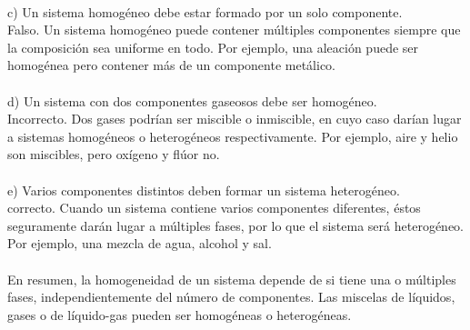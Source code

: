 \documentclass{article}
\begin{document}
\begin{itemize}
\\
c) Un sistema homogéneo debe estar formado por un solo componente.\\
Falso. Un sistema homogéneo puede contener múltiples componentes siempre que la composición sea uniforme en todo. Por ejemplo, una aleación puede ser homogénea pero contener más de un componente metálico.\\
\\
d) Un sistema con dos componentes gaseosos debe ser homogéneo.\\
Incorrecto. Dos gases podrían ser miscible o inmiscible, en cuyo caso darían lugar a sistemas homogéneos o heterogéneos respectivamente. Por ejemplo, aire y helio son miscibles, pero oxígeno y flúor no.\\
\\
e) Varios componentes distintos deben formar un sistema heterogéneo.\\
correcto. Cuando un sistema contiene varios componentes diferentes, éstos seguramente darán lugar a múltiples fases, por lo que el sistema será heterogéneo. Por ejemplo, una mezcla de agua, alcohol y sal.\\
\\
En resumen, la homogeneidad de un sistema depende de si tiene una o múltiples fases, independientemente del número de componentes. Las miscelas de líquidos, gases o de líquido-gas pueden ser homogéneas o heterogéneas.\\


\end{itemize}
\end{document}
